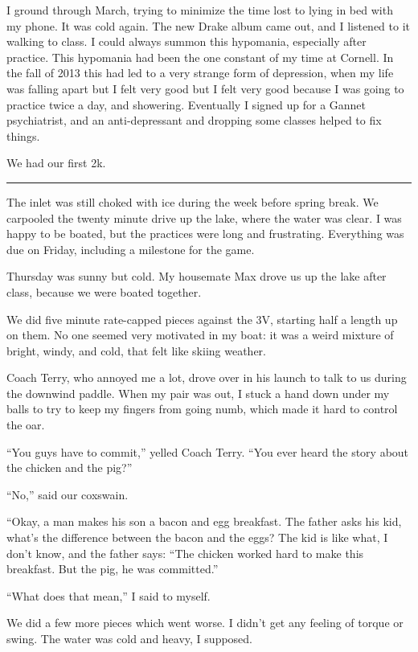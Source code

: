 I ground through March, trying to minimize the time lost to lying in bed with my
phone.  It was cold again.  The new Drake album came out, and I listened to it
walking to class.  I could always summon this hypomania, especially after
practice.  This hypomania had been the one constant of my time at Cornell.  In
the fall of 2013 this had led to a very strange form of depression, when my
life was falling apart but I felt very good but I felt very good because I was
going to practice twice a day, and showering.  Eventually I signed up for a
Gannet psychiatrist, and an anti-depressant and dropping some classes helped to
fix things.

We had our first 2k.

\plainfancybreak{12pt}{2}{* * *}

The inlet was still choked with ice during the week before spring break.  We
carpooled the twenty minute drive up the lake, where the water was clear.  I was
happy to be boated, but the practices were long and frustrating.  Everything was
due on Friday, including a milestone for the game. 

Thursday was sunny but cold.  My housemate Max drove us up the lake after
class, because we were boated together. 

We did five minute rate-capped pieces against the 3V, starting half a length up
on them.  No one seemed very motivated in my boat: it was a weird mixture of
bright, windy, and cold, that felt like skiing weather.

Coach Terry, who annoyed me a lot, drove over in his launch to talk to us during
the downwind paddle.  When my pair was out, I stuck a hand down under my balls
to try to keep my fingers from going numb, which made it hard to control the
oar.

``You guys have to commit,'' yelled Coach Terry.  ``You ever heard the story
about the chicken and the pig?'' 

``No,'' said our coxswain.  

``Okay, a man makes his son a bacon and egg breakfast.  The father asks his kid,
what's the difference between the bacon and the eggs?  The kid is like what, I
don't know, and the father says: ``The chicken worked hard to make this
breakfast.  But the pig, he was committed.''

``What does that mean,'' I said to myself.

We did a few more pieces which went worse.  I didn't get any feeling of torque
or swing.  The water was cold and heavy, I supposed. 

